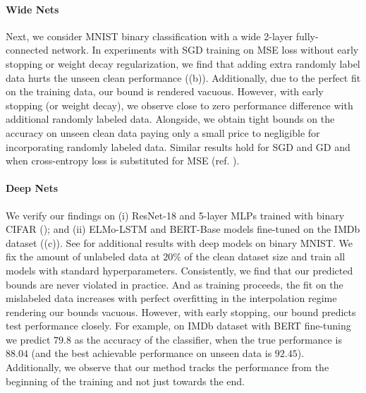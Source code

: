 \paragraph{Wide Nets} 
Next, we consider MNIST binary classification 
with a wide 2-layer fully-connected network.  
In experiments with SGD training on MSE loss
without early stopping 
or weight decay regularization, 
we find that adding extra randomly label data 
hurts the unseen clean performance 
((b)). 
Additionally, due to the perfect fit 
on the training data, 
our bound is rendered vacuous. 
However, with early stopping (or weight decay), 
we observe close to zero performance difference 
with additional randomly labeled data.
Alongside, we obtain tight bounds 
on the accuracy on unseen clean data 
paying only a small price to negligible
for incorporating randomly labeled data. 
Similar results hold for SGD and GD 
and when cross-entropy loss 
is substituted for MSE (ref. ).  

\paragraph{Deep Nets} 
We verify our findings on 
(i) ResNet-18 and 5-layer MLPs
trained with binary CIFAR  
(); 
and (ii) ELMo-LSTM and BERT-Base models
fine-tuned on the IMDb dataset 
((c)). 
See  for additional results 
with deep models on binary MNIST. 
We fix the amount of unlabeled data 
at $20\%$ of the clean dataset size 
and train all models 
with standard hyperparameters. 
Consistently, we find 
that our predicted bounds
are never violated in practice.
And as training proceeds, 
the fit on the mislabeled data increases 
with perfect overfitting 
in the interpolation regime 
rendering our bounds vacuous. 
However, with early stopping, 
our bound predicts test performance closely. 
For example, on IMDb dataset with BERT fine-tuning 
we predict $79.8$ as the accuracy of the classifier, 
when the true performance is $88.04$ 
(and the best achievable performance on unseen data is $92.45$). 
Additionally, we observe 
that our method tracks the performance
from the beginning of the training 
and not just towards the end.


